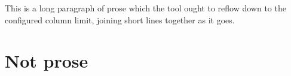 This is a long paragraph of prose which the tool ought to
reflow down to the configured column limit, joining short
lines together as it goes.

\section{Not prose}
\label{sec:x}
